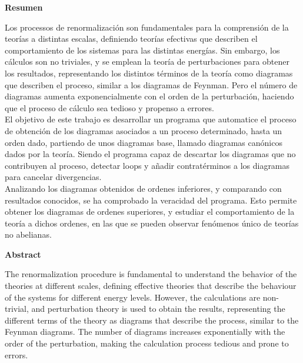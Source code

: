 \documentclass[11pt,a4paper,twoside,pdf]{article}
\numberwithin{equation}{section}
\begin{document}
\newpage
%
\begin{center}
{\bf Resumen}
\bigskip

\begin{minipage}{0.8\linewidth}
Los processos de renormalización son fundamentales para la comprensión de la 
teorías a distintas escalas, definiendo teorías efectivas que describen el
comportamiento de los sistemas para las distintas energías. Sin embargo, los 
cálculos son no triviales, y se emplean la teoría de perturbaciones para obtener
los resultados, representando los distintos términos de la teoría como diagramas 
que describen el proceso, similar a los diagramas de Feynman. Pero el número de
diagramas aumenta exponencialmente con el orden de la perturbación, haciendo que
el proceso de cálculo sea tedioso y propenso a errores. \\

El objetivo de este trabajo es desarrollar un programa que automatice el proceso
de obtención de los diagramas asociados a un proceso determinado, hasta un orden
dado, partiendo de unos diagramas base, llamado diagramas canónicos dados por la 
teoría. Siendo el programa capaz de descartar los diagramas que no contribuyen al 
proceso, detectar loops y añadir contratérminos a los diagramas para cancelar 
divergencias. \\

Analizando los diagramas obtenidos de ordenes inferiores, y comparando con 
resultados conocidos, se ha comprobado la veracidad del programa. Esto permite
obtener los diagramas de ordenes superiores, y estudiar el comportamiento de la 
teoría a dichos ordenes, en las que se pueden observar fenómenos único de teorías 
no abelianas.

\end{minipage}

\newpage

{\bf Abstract} 
\bigskip

\begin{minipage}{0.8\linewidth}
The renormalization procedure is fundamental to understand the behavior of the 
theories at different scales, defining effective theories that describe the
behaviour of the systems for different energy levels. However, the calculations are
non-trivial, and perturbation theory is used to obtain the results, representing
the different terms of the theory as diagrams that describe the process, similar
to the Feynman diagrams. The number of diagrams increases exponentially with
the order of the perturbation, making the calculation process tedious and prone to
errors. \\


\end{minipage}
\end{center}
\end{document}
